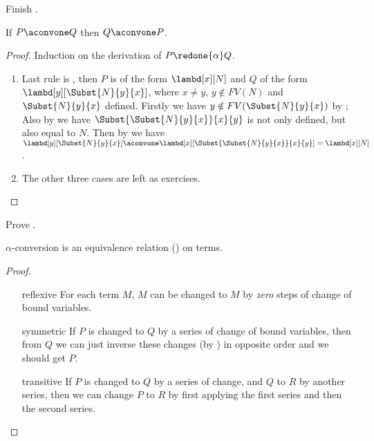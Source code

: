 \documentclass[../../../include/open-logic-section]{subfiles}
\begin{document}
\begin{prob}
  Finish .
\end{prob}

\begin{lem}
  If $P \aconvone Q$ then $Q \aconvone P$.
\end{lem}
\begin{proof}
  Induction on the derivation of $P \redone{\alpha} Q$.
  \begin{enumerate}
  \item Last rule is , then $P$ is of the form
    $\lambd[x][N]$ and $Q$ of the form
    $\lambd[y][\Subst{N}{y}{x}]$, where $x \neq y$, $y \notin FV(N)$ and
    $\Subst{N}{y}{x}$ defined. Firstly we have $y \notin
    FV(\Subst{N}{y}{x})$ by ; Also 
    by  we have
    $\Subst{\Subst{N}{y}{x}}{x}{y}$ is not only defined, but
    also equal to $N$. Then by  we have
    $\lambd[y][\Subst{N}{y}{x}] \aconvone
    \lambd[x][\Subst{\Subst{N}{y}{x}}{x}{y}] = \lambd[x][N]$.
  \item The other three cases are left as exercises. 
  \end{enumerate}
\end{proof}

\begin{prob}
  Prove .
\end{prob}

\begin{thm}
  $\alpha$-conversion is an equivalence relation () on terms.
\end{thm}
\begin{proof}
  \begin{enumerate}
  \item[reflexive] For each term $M$, $M$ can be changed to $M$ by
    \emph{zero} steps of change of bound variables.
  \item[symmetric] If $P$ is changed to $Q$ by a series of change
    of bound variables, then from $Q$ we can just inverse these
    changes (by ) in
    opposite order and we should get $P$.
  \item[transitive] If $P$ is changed to $Q$ by a series of
    change, and $Q$ to $R$ by another series, then we can change
    $P$ to $R$ by first applying the first series and then the
    second series.
  \end{enumerate}
\end{proof}
\end{document}
